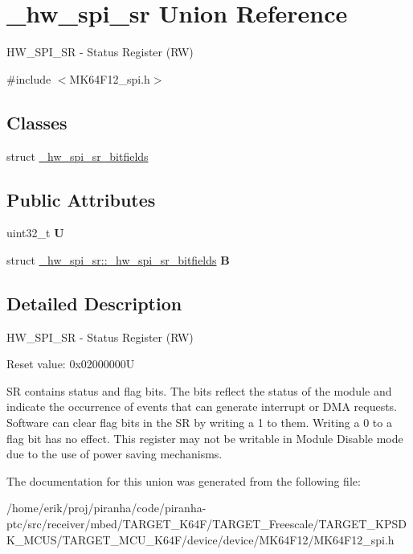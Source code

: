 \hypertarget{union__hw__spi__sr}{}\section{\+\_\+hw\+\_\+spi\+\_\+sr Union Reference}
\label{union__hw__spi__sr}


H\+W\+\_\+\+S\+P\+I\+\_\+\+SR -\/ Status Register (RW)  




{\ttfamily \#include $<$M\+K64\+F12\+\_\+spi.\+h$>$}

\subsection*{Classes}
\begin{DoxyCompactItemize}
\item 
struct \hyperlink{struct__hw__spi__sr_1_1__hw__spi__sr__bitfields}{\+\_\+hw\+\_\+spi\+\_\+sr\+\_\+bitfields}
\end{DoxyCompactItemize}
\subsection*{Public Attributes}
\begin{DoxyCompactItemize}
\item 
uint32\+\_\+t {\bfseries U}\hypertarget{union__hw__spi__sr_a3e86fde642b8402461d683f745c5af15}{}\label{union__hw__spi__sr_a3e86fde642b8402461d683f745c5af15}

\item 
struct \hyperlink{struct__hw__spi__sr_1_1__hw__spi__sr__bitfields}{\+\_\+hw\+\_\+spi\+\_\+sr\+::\+\_\+hw\+\_\+spi\+\_\+sr\+\_\+bitfields} {\bfseries B}\hypertarget{union__hw__spi__sr_aaba5c76357dcf18bfaf67f75c0bc3b8b}{}\label{union__hw__spi__sr_aaba5c76357dcf18bfaf67f75c0bc3b8b}

\end{DoxyCompactItemize}


\subsection{Detailed Description}
H\+W\+\_\+\+S\+P\+I\+\_\+\+SR -\/ Status Register (RW) 

Reset value\+: 0x02000000U

SR contains status and flag bits. The bits reflect the status of the module and indicate the occurrence of events that can generate interrupt or D\+MA requests. Software can clear flag bits in the SR by writing a 1 to them. Writing a 0 to a flag bit has no effect. This register may not be writable in Module Disable mode due to the use of power saving mechanisms. 

The documentation for this union was generated from the following file\+:\begin{DoxyCompactItemize}
\item 
/home/erik/proj/piranha/code/piranha-\/ptc/src/receiver/mbed/\+T\+A\+R\+G\+E\+T\+\_\+\+K64\+F/\+T\+A\+R\+G\+E\+T\+\_\+\+Freescale/\+T\+A\+R\+G\+E\+T\+\_\+\+K\+P\+S\+D\+K\+\_\+\+M\+C\+U\+S/\+T\+A\+R\+G\+E\+T\+\_\+\+M\+C\+U\+\_\+\+K64\+F/device/device/\+M\+K64\+F12/M\+K64\+F12\+\_\+spi.\+h\end{DoxyCompactItemize}
